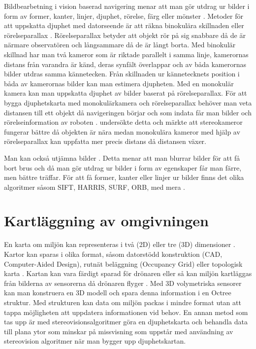 Bildbearbetning i vision baserad navigering menar att man gör utdrag ur bilder i form av former, kanter, linjer, djuphet, rörelse, färg eller mönster \citep{982903}. Metoder för att uppskatta djuphet med datorseende är att räkna binokulära skillnaden eller rörelseparallax \citep{suomimainittu}. Rörelseparallax betyder att objekt rör på sig snabbare då de är närmare observatören och långsammare då de är långt borta. Med binokulär skillnad har man två kameror som är riktade parallelt i samma linje, kamerornas distans från varandra är känd, deras synfält överlappar och av båda kamerornas bilder utdras samma kännetecken. Från skillnaden ur kännetecknets position i båda av kamerornas bilder kan man estimera djupheten. Med en monokulär kamera kan man uppskatta djuphet av bilder baserat på rörelseparallax. För att bygga djuphetskarta med monokulärkamera och rörelseparallax behöver man veta distansen till ett objekt då navigeringen börjar och som indata får man bilder och rörelseinformation av roboten \citep{suomimainittu}. \cite{suomimainittu} undersökte detta och märkte att stereokameror fungerar bättre då objekten är nära medan monokulära kameror med hjälp av rörelseparallax kan uppfatta mer precis distans då distansen växer. 

Man kan också utjämna bilder \citep{mapbuildingsift}. Detta menar att man blurrar bilder för att få bort brus och då man gör utdrag ur bilder i form av egenskaper får man färre, men bättre träffar. För att få former, kanter eller linjer ur bilder finns det olika algoritmer såsom SIFT, HARRIS, SURF, ORB, med mera \citep{8930783, slamproblem, mapbuildingsift}.

\section{Kartläggning av omgivningen}

En karta om miljön kan representeras i två (2D) eller tre (3D) dimensioner \citep{geospatial}. Kartor kan sparas i olika format, såsom datorstödd konstruktion (CAD, Computer-Aided Design), rutnät beläggning (Occupancy Grid) eller topologisk karta \citep{982903}. Kartan kan vara färdigt sparad för drönaren eller så kan miljön kartläggas från bilderna av sensorerna då drönaren flyger \citep{geospatial}. Med 3D volymetriska sensorer kan man konstruera en 3D modell och spara denna information i en Octree struktur. Med strukturen kan data om miljön packas i mindre format utan att tappa möjligheten att uppdatera informationen vid behov. En annan metod som tas upp är med stereovisionsalgoritmer göra en djuphetskarta och behandla data till plana ytor som minskar på missvisning som uppstår med användning av stereovision algoritmer när man bygger upp djuphetskartan.

